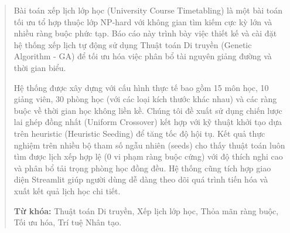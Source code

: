 \begin{abstract}
Bài toán xếp lịch lớp học (University Course Timetabling) là một bài toán tối ưu tổ hợp thuộc lớp NP-hard với không gian tìm kiếm cực kỳ lớn và nhiều ràng buộc phức tạp. Báo cáo này trình bày việc thiết kế và cài đặt hệ thống xếp lịch tự động sử dụng Thuật toán Di truyền (Genetic Algorithm - GA) để tối ưu hóa việc phân bổ tài nguyên giảng đường và thời gian biểu. 

Hệ thống được xây dựng với cấu hình thực tế bao gồm 15 môn học, 10 giảng viên, 30 phòng học (với các loại kích thước khác nhau) và các ràng buộc về thời gian học không liền kề. Chúng tôi đề xuất sử dụng chiến lược lai ghép đồng nhất (Uniform Crossover) kết hợp với kỹ thuật khởi tạo dựa trên heuristic (Heuristic Seeding) để tăng tốc độ hội tụ. Kết quả thực nghiệm trên nhiều bộ tham số ngẫu nhiên (seeds) cho thấy thuật toán luôn tìm được lịch xếp hợp lệ (0 vi phạm ràng buộc cứng) với độ thích nghi cao và phân bổ tải trọng phòng học đồng đều. Hệ thống cũng tích hợp giao diện Streamlit giúp người dùng dễ dàng theo dõi quá trình tiến hóa và xuất kết quả lịch học chi tiết.

\textbf{Từ khóa:} Thuật toán Di truyền, Xếp lịch lớp học, Thỏa mãn ràng buộc, Tối ưu hóa, Trí tuệ Nhân tạo.
\end{abstract}
